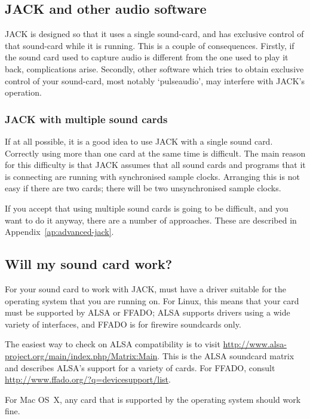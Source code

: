 \documentclass[10pt,a4paper]{book}
\begin{document}
{\subsection{JACK and other audio software}

JACK is designed so that it uses a single sound-card, and has
exclusive control of that sound-card while it is running.  This is a
couple of consequences.  Firstly, if the sound card used to capture
audio is different from the one used to play it back, complications
arise.  Secondly, other software which tries to obtain exclusive
control of your sound-card, most notably `pulseaudio', may interfere
with JACK's operation.

\subsubsection{JACK with multiple sound cards}
\label{sec:jack-multiple-cards}

If at all possible, it is a good idea to use JACK with a single sound
card.  Correctly using more than one card at the same time is
difficult.  The main reason for this difficulty is that JACK assumes
that all sound cards and programs that it is connecting are running
with synchronised sample clocks.  Arranging this is not easy if there
are two cards; there will be two unsynchronised sample clocks.

If you accept that using multiple sound cards is going to be
difficult, and you want to do it anyway, there are a number of
approaches.  These are described in Appendix~\ref{ap:advanced-jack}.

\subsection{Will my sound card work?}

For your sound card to work with JACK, must have a driver suitable for
the operating system that you are running on.  For Linux, this means
that your card must be supported by ALSA or FFADO; ALSA supports
drivers using a wide variety of interfaces, and FFADO is for firewire
soundcards only. 

The easiest way to check on ALSA compatibility is to visit
\url{http://www.alsa-project.org/main/index.php/Matrix:Main}.  This is
the ALSA soundcard matrix and describes ALSA's support for a variety
of cards.  For FFADO, consult
\url{http://www.ffado.org/?q=devicesupport/list}.

For Mac OS~X, any card that is supported by the operating system
should work fine.


}
\end{document}
